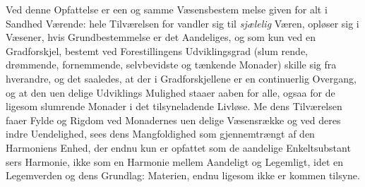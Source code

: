 \documentclass[12pt,a4paper]{book}
\begin{document}
Ved denne Opfattelse er een og samme Væsensbestem\-%
melse given for alt i Sandhed Værende: hele Tilværelsen for\-%
vandler sig til \emph{sjælelig} Væren, opløser sig i Væsener, hvis
Grundbestemmelse er det Aandeliges, og som kun ved en
Gradforskjel, bestemt ved Forestillingens Udviklingsgrad (slum\-%
rende, drømmende, fornemmende, selvbevidste og tænkende
Monader) skille sig fra hverandre, og det saaledes, at der i
Gradforskjellene er en continuerlig Overgang, og at den uen\-%
delige Udviklings Mulighed staaer aaben for alle, ogsaa for de
ligesom slumrende Monader i det tilsyneladende Livløse. Me\-%
dens Tilværelsen faaer Fylde og Rigdom ved Monadernes uen\-%
delige Væsensrække og ved deres indre Uendelighed, sees dens
Mangfoldighed som gjennemtrængt af den Harmoniens Enhed,
der endnu kun er opfattet som de aandelige Enkeltsubstant\-%
sers Harmonie, ikke som en Harmonie mellem Aandeligt og
Legemligt, idet en Legemverden og dens Grundlag: Materien,
endnu ligesom ikke er kommen tilsyne.
\end{document}
